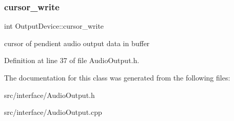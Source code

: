 \subsubsection{\texorpdfstring{cursor\+\_\+write}{cursor\_write}}
{\footnotesize\ttfamily int Output\+Device\+::cursor\+\_\+write}

cursor of pendient audio output data in buffer 

Definition at line 37 of file Audio\+Output.\+h.



The documentation for this class was generated from the following files\+:\begin{DoxyCompactItemize}
\item 
src/interface/Audio\+Output.\+h\item 
src/interface/Audio\+Output.\+cpp\end{DoxyCompactItemize}
